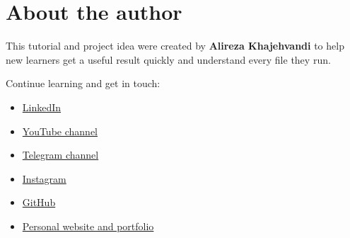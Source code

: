 \documentclass[11pt,openany]{book}
\begin{document}
\mainmatter







\backmatter
\chapter*{About the author}
This tutorial and project idea were created by \textbf{Alireza Khajehvandi} to
help new learners get a useful result quickly and understand every file they run.

Continue learning and get in touch:
\begin{itemize}
\item \href{https://www.linkedin.com/in/alirezakhajehvandi}{LinkedIn}
\item \href{https://www.youtube.com/@AlirezaAIES}{YouTube channel}
\item \href{https://t.me/AlirezaAIES}{Telegram channel}
\item \href{https://www.instagram.com/alireza.aies}{Instagram}
\item \href{https://github.com/alirezaaies}{GitHub}
\item \href{https://alirezaaies.github.io/}{Personal website and portfolio}
\end{itemize}
\end{document}
